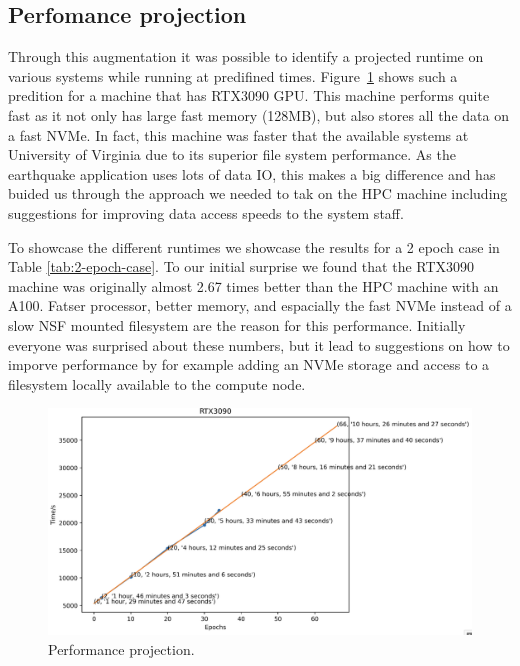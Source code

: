 \documentclass[utf8]{FrontiersinVancouver} %
\begin{document}
\subsection{Perfomance projection}


Through this augmentation it was possible to identify a projected
runtime on various systems while running at predifined
times. Figure~\ref{fig:performance-projection} shows such a predition
for a machine that has RTX3090 GPU. This machine performs quite fast
as it not only has large fast memory (128MB), but also stores all the
data on a fast NVMe. In fact, this machine was faster that the
available systems at University of Virginia due to its superior file
system performance. As the earthquake application uses lots of data
IO, this makes a big difference and has buided us through the approach
we needed to tak on the HPC machine including suggestions for
improving data access speeds to the system staff.

To showcase the different runtimes we showcase the results for a 2
epoch case in Table \ref{tab:2-epoch-case}. To our initial surprise we
found that the RTX3090 machine was originally almost 2.67 times better
than the HPC machine with an A100. Fatser processor, better memory,
and espacially the fast NVMe instead of a slow NSF mounted filesystem
are the reason for this performance. Initially everyone was surprised
about these numbers, but it lead to suggestions on how to imporve
performance by for example adding an NVMe storage and access to a
filesystem locally available to the compute node.


\begin{figure}[htb]
    \centering
    \includegraphics[width=0.70\columnwidth]{images/performance-projection.png}
    \caption{Performance projection. }
    \label{fig:performance-projection}
\end{figure}
\end{document}
